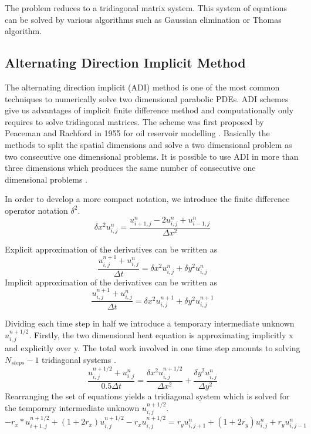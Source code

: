 \documentclass[12pt, oneside]{book}
\theoremstyle{plain}
\theoremstyle{definition}
\begin{document}
The problem reduces to a tridiagonal matrix system. This system of equations can be solved by various algorithms such as Gaussian elimination or Thomas algorithm.

\subsection{Alternating Direction Implicit Method}
The alternating direction implicit (ADI) method is one of the most common techniques to numerically solve two dimensional parabolic PDEs. ADI schemes give us advantages of implicit finite difference method and computationally only requires to solve tridiagonal matrices.  The scheme was first proposed by Peaceman and Rachford in 1955 for oil reservoir modelling \cite{peace}. Basically the methods to split the spatial dimensions and solve a two dimensional problem as two consecutive one dimensional problems. It is possible to use ADI in more than three dimensions which produces the same number of consecutive one dimensional problems \cite{DougADI}.

In order to develop a more compact notation, we introduce the finite difference operator notation $\delta^2$.
\begin{equation}
\delta x^2 u^{n}_{i,j}  = \frac{u^{n}_{i+1,j} - 2u^{n}_{i,j} + u^{n}_{i-1,j}}{\Delta x^2}
\end{equation}

Explicit approximation of the derivatives can be written as
\begin{equation}
\frac{u^{n+1}_{i,j} + u^{n}_{i,j}}{\Delta t} = \delta x^2 u^{n}_{i,j} + \delta y^2 u^{n}_{i,j}
\end{equation}
Implicit  approximation of the derivatives can be written as
\begin{equation}
\frac{u^{n+1}_{i,j} + u^{n}_{i,j}}{\Delta t} = \delta x^2 u^{n+1}_{i,j} + \delta y^2 u^{n+1}_{i,j}
\end{equation}

Dividing each time step in half we introduce a temporary intermediate unknown $u^{n+1/2}_{i,j}$. Firstly, the two dimensional heat equation is approximating implicitly x and explicitly over y. The total work involved in one time step amounts to solving $ N_{steps} - 1$ tridiagonal systems \cite{morton}. 
\begin{equation}
\frac{u^{n+1/2}_{i,j} + u^{n}_{i,j}}{0.5 \Delta t} = \frac{\delta x^2 u^{n+1/2}_{i,j} }{\Delta x^2} + \frac{\delta y^2 u^{n}_{i,j}}{\Delta y^2}
\end{equation}
Rearranging the set of equations yields a tridiagonal system which is solved for the temporary intermediate unknown $u^{n+1/2}_{i,j}$.
\begin{equation}
- r_x * u^{n+1/2}_{i+1,j} + (1 + 2r_x) u^{n+1/2}_{i,j}  - r_x u^{n+1/2}_{i,j}  = r_y u^{n}_{i,j+1} + (1 + 2r_y) u^{n}_{i,j} + r_y u^{n}_{i,j-1}
\end{equation}
\end{document}

